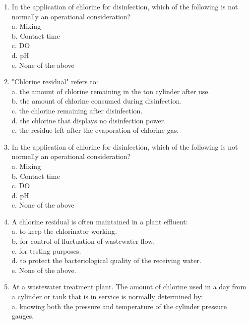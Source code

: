 \begin{tcolorbox}[breakable, enhanced,
colframe=blue!25,
colback=blue!10,
coltitle=blue!20!black,  
title= Chapter Assessment]
\begin{enumerate}
c. Destroy pathogenic organisms \\
d. Protect downstream users from waterborne diseases \\
\item In the application of chlorine for disinfection, which of the following is not normally an operational consideration? \\
a. Mixing \\
b. Contact time \\
c. DO \\
d. pH \\
e. None of the above \\
\item "Chlorine residual" refers to: \\
a. the amount of chlorine remaining in the ton cylinder after use. \\
b. the amount of chlorine consumed during disinfection. \\
c. the chlorine remaining after disinfection. \\
d. the chlorine that displays no disinfection power. \\
e. the residue left after the evaporation of chlorine gas. \\
\item In the application of chlorine for disinfection, which of the following is not normally an operational consideration? \\
a. Mixing \\
b. Contact time \\
c. DO \\
d. pH \\
e. None of the above \\
\item A chlorine residual is often maintained in a plant effluent: \\
a. to keep the chlorinator working. \\
b. for control of fluctuation of wastewater flow. \\
c. for testing purposes. \\
d. to protect the bacteriological quality of the receiving water. \\
e. None of the above. \\
\item At a wastewater treatment plant. The amount of chlorine used in a day from a cylinder or tank that is in service is normally determined by: \\
a. knowing both the pressure and temperature of the cylinder pressure gauges. \\

\end{enumerate}
\end{tcolorbox}

